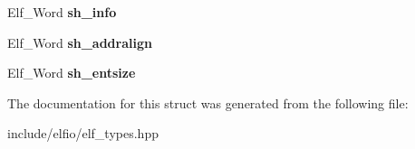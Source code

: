 \begin{DoxyCompactItemize}
\item 
Elf\+\_\+\+Word {\bfseries sh\+\_\+info}\hypertarget{struct_e_l_f_i_o_1_1_elf32___shdr_a1897ba9e80ff128682cb75b58da2dc68}{}\label{struct_e_l_f_i_o_1_1_elf32___shdr_a1897ba9e80ff128682cb75b58da2dc68}

\item 
Elf\+\_\+\+Word {\bfseries sh\+\_\+addralign}\hypertarget{struct_e_l_f_i_o_1_1_elf32___shdr_a01c7649587801d387dbc3c19c6ee4ba0}{}\label{struct_e_l_f_i_o_1_1_elf32___shdr_a01c7649587801d387dbc3c19c6ee4ba0}

\item 
Elf\+\_\+\+Word {\bfseries sh\+\_\+entsize}\hypertarget{struct_e_l_f_i_o_1_1_elf32___shdr_a30f8ac426c49f69bd00b1c07f34bbe9c}{}\label{struct_e_l_f_i_o_1_1_elf32___shdr_a30f8ac426c49f69bd00b1c07f34bbe9c}

\end{DoxyCompactItemize}


The documentation for this struct was generated from the following file\+:\begin{DoxyCompactItemize}
\item 
include/elfio/elf\+\_\+types.\+hpp\end{DoxyCompactItemize}

